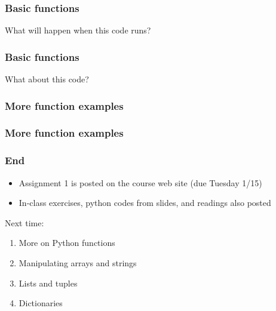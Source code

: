 \documentclass{beamer}
\begin{document}
\begin{frame}
\frametitle{Basic functions}

What will happen when this code runs?



\end{frame}

\begin{frame}
\frametitle{Basic functions}

What about this code?

\end{frame}


\begin{frame}
\frametitle{More function examples}

\end{frame}

\begin{frame}
\frametitle{More function examples}

\end{frame}


\begin{frame}
\frametitle{End}
\begin{itemize}
\setlength{\itemsep}{0.05in}
\item{Assignment 1 is posted on the course web site (due Tuesday 1/15)}
\item{In-class exercises, python codes from slides, and readings also posted}
\end{itemize}

Next time:
\begin{enumerate}
\setlength{\itemsep}{0.05in}
\item{More on Python functions}
\item{Manipulating arrays and strings}
\item{Lists and tuples}
\item{Dictionaries}
\end{enumerate}

\end{frame}
\end{document}
